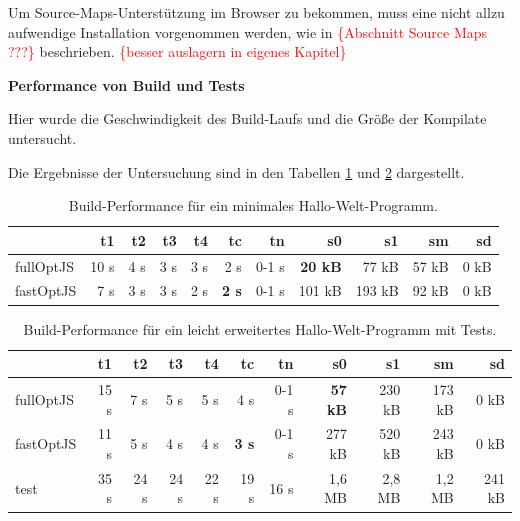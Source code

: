 \documentclass[a4paper, 12pt, hidelinks, listof=totoc, listoftables=totoc, bibliography=totoc]{scrreprt}
\newcommand{\TODOi}[1]{\textcolor{red}{\{#1\}}}
\newcommand{\MyMiniSec}[1]{\rmfamily\fontsize{12}{15}\selectfont
	\vspace{7pt}\textbf{#1} %
}
\begin{document}
Um Source-Maps-Unterstützung im Browser zu bekommen, muss eine nicht allzu aufwendige Installation vorgenommen werden, wie in \TODOi{Abschnitt Source Maps ???} beschrieben. \TODOi{besser auslagern in eigenes Kapitel}

\MyMiniSec{Performance von Build und Tests}

Hier wurde die Geschwindigkeit des Build-Laufs und die Größe der Kompilate untersucht.

Die Ergebnisse der Untersuchung sind in den Tabellen \ref{table:compiler-performance1} und \ref{table:compiler-performance2} dargestellt.

\medskip

\begin{table}[!h]
\begin{tabular}{|l|r|r|r|r|r|r||r|r|r|r|}
\hline           & t1   & t2   & t3   & t4   & tc            & tn    & s0             & s1     & sm    & sd    \\ 
\hline fullOptJS & 10 s &  4 s &  3 s &  3 s &          2 s  & 0-1 s & \textbf{20 kB} &  77 kB & 57 kB &  0 kB \\ 
\hline fastOptJS &  7 s &  3 s &  3 s &  2 s &  \textbf{2 s} & 0-1 s &        101 kB  & 193 kB & 92 kB &  0 kB \\ 
\hline 
\end{tabular} 
\caption{Build-Performance für ein minimales Hallo-Welt-Programm.}
\label{table:compiler-performance1}
\end{table}

\medskip

\begin{table}[!h]
\begin{tabular}{|l|r|r|r|r|r|r||r|r|r|r|}
\hline           & t1   & t2   & t3   & t4   & tc            & tn    & s0             & s1     & sm     & sd     \\ 
\hline fullOptJS & 15 s &  7 s &  5 s &  5 s &          4 s  & 0-1 s & \textbf{57 kB} & 230 kB & 173 kB &   0 kB \\ 
\hline fastOptJS & 11 s &  5 s &  4 s &  4 s &  \textbf{3 s} & 0-1 s &        277 kB  & 520 kB & 243 kB &   0 kB \\ 
\hline test      & 35 s & 24 s & 24 s & 22 s &         19 s  &  16 s &        1,6 MB  & 2,8 MB & 1,2 MB & 241 kB \\ 
\hline 
\end{tabular} 
\caption{Build-Performance für ein leicht erweitertes Hallo-Welt-Programm mit Tests.}
\label{table:compiler-performance2}
\end{table}
\end{document}

